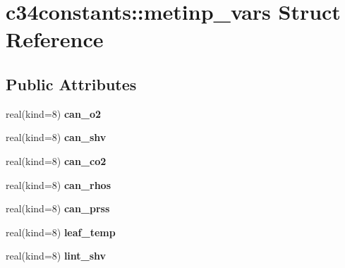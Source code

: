 \hypertarget{structc34constants_1_1metinp__vars}{
\section{c34constants::metinp\_\-vars Struct Reference}
\label{structc34constants_1_1metinp__vars}
}
\subsection*{Public Attributes}
\begin{DoxyCompactItemize}
\item 
\hypertarget{structc34constants_1_1metinp__vars_ac4ff3f7bf3ce91dc2d4250ab555e6491}{
real(kind=8) {\bfseries can\_\-o2}}
\label{structc34constants_1_1metinp__vars_ac4ff3f7bf3ce91dc2d4250ab555e6491}

\item 
\hypertarget{structc34constants_1_1metinp__vars_af69429266c9ab7915856e51f4a811b21}{
real(kind=8) {\bfseries can\_\-shv}}
\label{structc34constants_1_1metinp__vars_af69429266c9ab7915856e51f4a811b21}

\item 
\hypertarget{structc34constants_1_1metinp__vars_a0f79ddb283843b188571754a2a9c229c}{
real(kind=8) {\bfseries can\_\-co2}}
\label{structc34constants_1_1metinp__vars_a0f79ddb283843b188571754a2a9c229c}

\item 
\hypertarget{structc34constants_1_1metinp__vars_a43b1a25b694a4e45600dfeeba8ae7f72}{
real(kind=8) {\bfseries can\_\-rhos}}
\label{structc34constants_1_1metinp__vars_a43b1a25b694a4e45600dfeeba8ae7f72}

\item 
\hypertarget{structc34constants_1_1metinp__vars_a654811c688c8046b0e2f8703aeb9da8c}{
real(kind=8) {\bfseries can\_\-prss}}
\label{structc34constants_1_1metinp__vars_a654811c688c8046b0e2f8703aeb9da8c}

\item 
\hypertarget{structc34constants_1_1metinp__vars_a5f66f6fa515fcee3a5a00b323cd60a76}{
real(kind=8) {\bfseries leaf\_\-temp}}
\label{structc34constants_1_1metinp__vars_a5f66f6fa515fcee3a5a00b323cd60a76}

\item 
\hypertarget{structc34constants_1_1metinp__vars_a8cf66324715d983f7b618d876099090c}{
real(kind=8) {\bfseries lint\_\-shv}}
\label{structc34constants_1_1metinp__vars_a8cf66324715d983f7b618d876099090c}


\end{DoxyCompactItemize}

